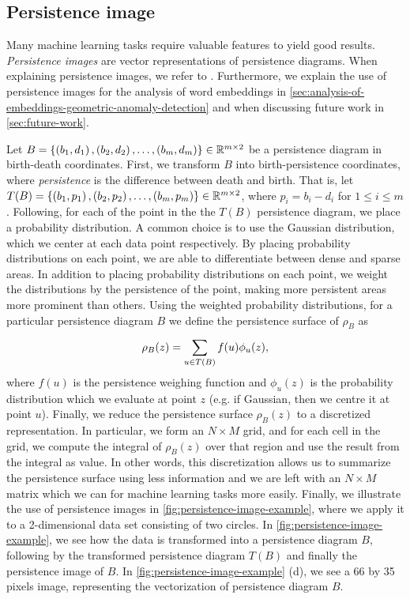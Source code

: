 \subsection{Persistence image}
\label{sec:persistence-image}
Many machine learning tasks require valuable features to yield good results. \textit{Persistence images} \cite{adams2016persistence} are vector representations of persistence diagrams. When explaining persistence images, we refer to \cite{adams2016persistence}. Furthermore, we explain the use of persistence images for the analysis of word embeddings in \cref{sec:analysis-of-embeddings-geometric-anomaly-detection} and when discussing future work in \cref{sec:future-work}.

Let $B = \left\{\left(b_1, d_1\right), \left(b_2, d_2\right), \ldots, \left(b_m, d_m\right)\right\} \in \mathbb{R}^{m \times 2}$ be a persistence diagram in birth-death coordinates. First, we transform $B$ into birth-persistence coordinates, where \textit{persistence} is the difference between death and birth. That is, let $T(B) = \left\{\left(b_1, p_1\right), \left(b_2, p_2\right), \ldots, \left(b_m, p_m\right)\right\} \in \mathbb{R}^{m \times 2}$, where $p_i = b_i - d_i$ for $1 \leq i \leq m$. Following, for each of the point in the the $T(B)$ persistence diagram, we place a probability distribution. A common choice is to use the Gaussian distribution, which we center at each data point respectively. By placing probability distributions on each point, we are able to differentiate between dense and sparse areas. In addition to placing probability distributions on each point, we weight the distributions by the persistence of the point, making more persistent areas more prominent than others. Using the weighted probability distributions, for a particular persistence diagram $B$ we define the persistence surface of $\rho_B$ as
\begin{align}
    \rho_B(z) = \sum\limits_{u \in T(B)}^{} f(u) \phi_u(z),
\end{align}
where $f(u)$ is the persistence weighing function and $\phi_u(z)$ is the probability distribution which we evaluate at point $z$ (e.g. if Gaussian, then we centre it at point $u$). Finally, we reduce the persistence surface $\rho_B(z)$ to a discretized representation. In particular, we form an $N \times M$ grid, and for each cell in the grid, we compute the integral of $\rho_B(z)$ over that region and use the result from the integral as value. In other words, this discretization allows us to summarize the persistence surface using less information and we are left with an $N \times M$ matrix which we can for machine learning tasks more easily. Finally, we illustrate the use of persistence images in \cref{fig:persistence-image-example}, where we apply it to a 2-dimensional data set consisting of two circles. In \cref{fig:persistence-image-example}, we see how the data is transformed into a persistence diagram $B$, following by the transformed persistence diagram $T(B)$ and finally the persistence image of $B$. In \cref{fig:persistence-image-example} (d), we see a 66 by 35 pixels image, representing the vectorization of persistence diagram $B$.
